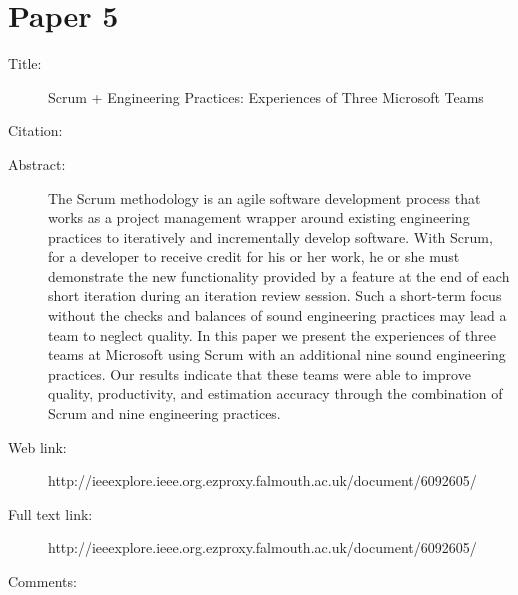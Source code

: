 \documentclass{scrartcl}
\begin{document}
\section*{Paper 5}
\begin{description}
\item[Title:] Scrum + Engineering Practices: Experiences of Three Microsoft Teams
\item[Citation:] \cite{bibtex_key}
\item[Abstract:] The Scrum methodology is an agile software development process that works as a project management wrapper around existing engineering practices to iteratively and incrementally develop software. With Scrum, for a developer to receive credit for his or her work, he or she must demonstrate the new functionality provided by a feature at the end of each short iteration during an iteration review session. Such a short-term focus without the checks and balances of sound engineering practices may lead a team to neglect quality. In this paper we present the experiences of three teams at Microsoft using Scrum with an additional nine sound engineering practices. Our results indicate that these teams were able to improve quality, productivity, and estimation accuracy through the combination of Scrum and nine engineering practices.
\item[Web link:] http://ieeexplore.ieee.org.ezproxy.falmouth.ac.uk/document/6092605/
\item[Full text link:] http://ieeexplore.ieee.org.ezproxy.falmouth.ac.uk/document/6092605/
\item[Comments:] 
\end{description}



\end{document}

